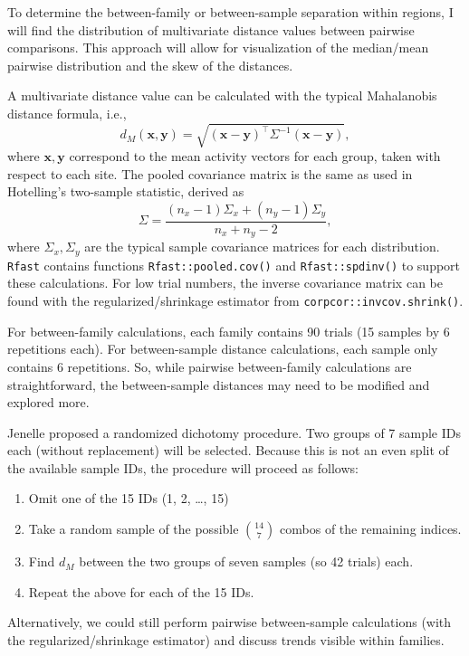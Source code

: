 \documentclass[
  11pt,
  letterpaper,
  DIV=11,
  numbers=noendperiod]{scrartcl}
\providecommand{\tightlist}{%
  \setlength{\itemsep}{0pt}\setlength{\parskip}{0pt}}
\begin{document}
To determine the between-family or between-sample separation within
regions, I will find the distribution of multivariate distance values
between pairwise comparisons. This approach will allow for visualization
of the median/mean pairwise distribution and the skew of the distances.

A multivariate distance value can be calculated with the typical
Mahalanobis distance formula, i.e., \[
d_M (\mathbf{x}, \mathbf{y}) = \sqrt{(\mathbf{x} - \mathbf{y})^\intercal \Sigma^{-1} (\mathbf{x} - \mathbf{y})},
\] where \(\mathbf{x}, \mathbf{y}\) correspond to the mean activity
vectors for each group, taken with respect to each site. The pooled
covariance matrix is the same as used in Hotelling's two-sample
statistic, derived as \[
\Sigma = 
\frac{(n_x - 1) \Sigma_x + (n_y - 1)\Sigma_y}{n_x + n_y - 2},
\] where \(\Sigma_x, \Sigma_y\) are the typical sample covariance
matrices for each distribution. \texttt{Rfast} contains functions
\texttt{Rfast::pooled.cov()} and \texttt{Rfast::spdinv()} to support
these calculations. For low trial numbers, the inverse covariance matrix
can be found with the regularized/shrinkage estimator from
\texttt{corpcor::invcov.shrink()}.

For between-family calculations, each family contains 90 trials (15
samples by 6 repetitions each). For between-sample distance
calculations, each sample only contains 6 repetitions. So, while
pairwise between-family calculations are straightforward, the
between-sample distances may need to be modified and explored more.

Jenelle proposed a randomized dichotomy procedure. Two groups of 7
sample IDs each (without replacement) will be selected. Because this is
not an even split of the available sample IDs, the procedure will
proceed as follows:

\begin{enumerate}
\def\labelenumi{\arabic{enumi}.}
\tightlist
\item
  Omit one of the 15 IDs (1, 2, \ldots, 15)
\item
  Take a random sample of the possible \(\binom{14}{7}\) combos of the
  remaining indices.
\item
  Find \(d_M\) between the two groups of seven samples (so 42 trials)
  each.
\item
  Repeat the above for each of the 15 IDs.
\end{enumerate}

Alternatively, we could still perform pairwise between-sample
calculations (with the regularized/shrinkage estimator) and discuss
trends visible within families.
\end{document}
